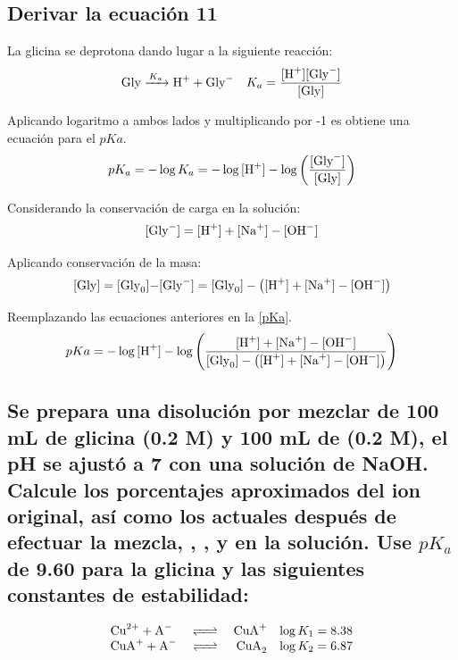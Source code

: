 \documentclass[fleqn,10pt]{SelfArx} %
\begin{document}
	\subsection{Derivar la ecuaci\'on 11}
	La glicina se deprotona dando lugar a la siguiente reacci\'on:
	\begin{equation}\label{Ka}
	\begin{array}{lr}
	\ce{Gly ->[K_a] H+ + Gly^-} & K_a = \dfrac{\ce{[H+][Gly^-]}}{\ce{[Gly]}}
	\end{array}
	\end{equation}
	
	Aplicando logaritmo a ambos lados y multiplicando por -1 es obtiene una ecuaci\'on para el $pKa$.
	\begin{equation}\label{pKa}
	pK_a = -\log K_a = -\log\ce{[H+]} - \log\left(\dfrac{\ce{[Gly^-]}}{\ce{[Gly]}}\right)
	\end{equation}
	
	Considerando la conservaci\'on de carga en la soluci\'on:
	\begin{equation}
	\ce{[Gly^-]} = \ce{[H+] + [Na+] - [OH^-]}
	\end{equation}
	
	Aplicando conservaci\'on de la masa:
	\footnotesize
	\begin{equation}
	\ce{[Gly]} = \ce{[Gly_0]-[Gly^-]} = \ce{[Gly_0]} - \left(\ce{[H+] + [Na+] - [OH^-]}\right)
	\end{equation}
	\normalsize
	
	\small
	Reemplazando las ecuaciones anteriores en la \autoref{pKa}.	
	\begin{equation*}
	pKa = -\log\ce{[H+]} - \log\left(\dfrac{\ce{[H+] + [Na+] - [OH^-]}}{\ce{[Gly_0]} - \left(\ce{[H+] + [Na+] - [OH^-]}\right)}\right)
	\end{equation*}
	\normalsize
	
	\subsection[Se prepara]{Se prepara una disoluci\'on por mezclar de 100 mL de glicina (0.2 M) y 100 mL de  (0.2 M), el pH se ajust\'o a 7 con una soluci\'on de NaOH. Calcule los porcentajes aproximados del ion  original, as\'i como los actuales despu\'es de efectuar la mezcla, , , y  en la soluci\'on. Use $pK_a$ de 9.60 para la glicina y las siguientes constantes de estabilidad:}
	\begin{equation*}
	\begin{array}{lcrc}
	\ce{Cu^{2+} + A-} & \ce{<=>} & \ce{CuA+} & \log K_1 = 8.38\\
	\ce{CuA+ + A-} & \ce{<=>} & \ce{CuA_2} & \log K_2 = 6.87 
	\end{array}
	\end{equation*}
	
\end{document}
